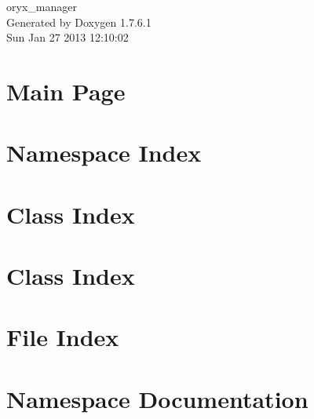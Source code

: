 \documentclass[a4paper]{book}
\begin{document}
\begin{titlepage}
\vspace*{7cm}
\begin{center}
{\Large oryx\-\_\-manager }\\
\vspace*{1cm}
{\large \-Generated by Doxygen 1.7.6.1}\\
\vspace*{0.5cm}
{\small Sun Jan 27 2013 12:10:02}\\
\end{center}
\end{titlepage}
\clearemptydoublepage
{}
\tableofcontents
\clearemptydoublepage
{}
\chapter{\-Main \-Page}
\label{index}
\chapter{\-Namespace \-Index}

\chapter{\-Class \-Index}

\chapter{\-Class \-Index}

\chapter{\-File \-Index}

\chapter{\-Namespace \-Documentation}







\end{document}
